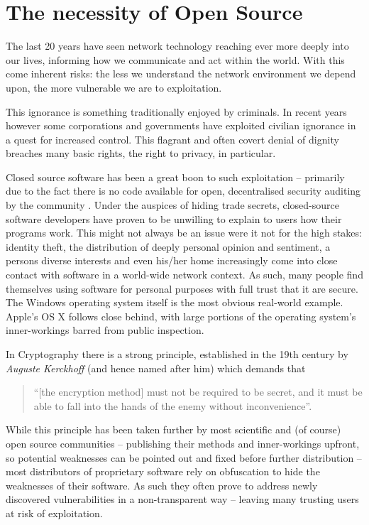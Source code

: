 \section{The necessity of Open Source}

The last 20 years have seen network technology reaching ever more deeply
into our lives, informing how we communicate and act within the world.
With this come inherent risks: the less we understand the network
environment we depend upon, the more vulnerable we are to exploitation.

This ignorance is something traditionally enjoyed by criminals. In
recent years however some corporations and governments have exploited
civilian ignorance in a quest for increased control. This flagrant and
often covert denial of dignity breaches many basic rights, the right to
privacy, in particular.

Closed source software has been a great boon to such exploitation --
primarily due to the fact there is no code available for open,
decentralised security auditing by the community . Under the auspices of
hiding trade secrets, closed-source software developers have proven to
be unwilling to explain to users how their programs work. This might not
always be an issue were it not for the high stakes: identity theft, the
distribution of deeply personal opinion and sentiment, a persons diverse
interests and even his/her home increasingly come into close contact
with software in a world-wide network context. As such, many people find
themselves using software for personal purposes with full trust that it
are secure. The Windows operating system itself is the most obvious
real-world example. Apple's OS X follows close behind, with large
portions of the operating system's inner-workings barred from public
inspection.

In Cryptography there is a strong principle, established in the 19th
century by \emph{Auguste Kerckhoff} (and hence named after him) which
demands that

\begin{quote}
``{[}the encryption method{]} must not be required to be secret, and it
must be able to fall into the hands of the enemy without
inconvenience''.

\end{quote}
While this principle has been taken further by most scientific and (of
course) open source communities -- publishing their methods and
inner-workings upfront, so potential weaknesses can be pointed out and
fixed before further distribution -- most distributors of proprietary
software rely on obfuscation to hide the weaknesses of their software.
As such they often prove to address newly discovered vulnerabilities in
a non-transparent way -- leaving many trusting users at risk of
exploitation.

